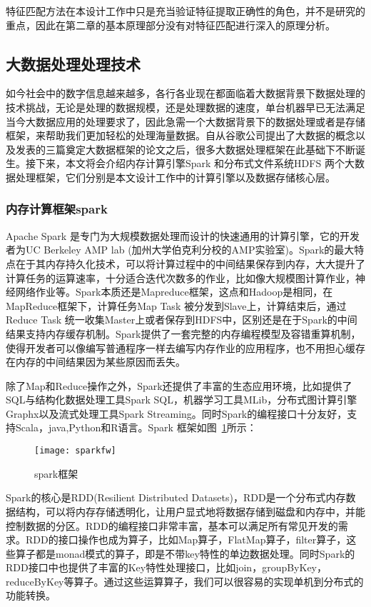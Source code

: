 特征匹配方法在本设计工作中只是充当验证特征提取正确性的角色，并不是研究的重点，因此在第二章的基本原理部分没有对特征匹配进行深入的原理分析。

\subsection{大数据处理处理技术}
如今社会中的数字信息越来越多，各行各业现在都面临着大数据背景下数据处理的技术挑战，无论是处理的数据规模，还是处理数据的速度，单台机器早已无法满足当今大数据应用的处理要求了，因此急需一个大数据背景下的数据处理或者是存储框架，来帮助我们更加轻松的处理海量数据。自从谷歌公司提出了大数据的概念以及发表的三篇奠定大数据框架的论文之后，很多大数据处理框架在此基础下不断诞生。接下来，本文将会介绍内存计算引擎Spark 和分布式文件系统HDFS 两个大数据处理框架，它们分别是本文设计工作中的计算引擎以及数据存储核心层。
\subsubsection{内存计算框架spark}
Apache Spark 是专门为大规模数据处理而设计的快速通用的计算引擎，它的开发者为UC Berkeley AMP lab (加州大学伯克利分校的AMP实验室)。Spark的最大特点在于其内存持久化技术，可以将计算过程中的中间结果保存到内存，大大提升了计算任务的运算速率，十分适合迭代次数多的作业，比如像大规模图计算作业，神经网络作业等。Spark本质还是Mapreduce框架，这点和Hadoop是相同，在MapReduce框架下，计算任务Map Task 被分发到Slave上，计算结束后，通过Reduce Task 统一收集Master上或者保存到HDFS中，区别还是在于Spark的中间结果支持内存缓存机制。Spark提供了一套完整的内存编程模型及容错重算机制，使得开发者可以像编写普通程序一样去编写内存作业的应用程序，也不用担心缓存在内存的中间结果因为某些原因而丢失。

除了Map和Reduce操作之外，Spark还提供了丰富的生态应用环境，比如提供了SQL与结构化数据处理工具Spark SQL，机器学习工具MLib，分布式图计算引擎Graphx以及流式处理工具Spark Streaming。同时Spark的编程接口十分友好，支持Scala，java,Python和R语言。Spark 框架如图~\ref{fig:sparkfw}所示：
\begin{figure}[htp]
\centering
\texttt{[image: sparkfw]}
\caption{spark框架}
\label{fig:sparkfw}
\end{figure}

Spark的核心是RDD(Resilient Distributed Datasets)，RDD是一个分布式内存数据结构，可以将内存存储透明化，让用户显式地将数据存储到磁盘和内存中，并能控制数据的分区。RDD的编程接口非常丰富，基本可以满足所有常见开发的需求。RDD的接口操作也成为算子，比如Map算子，FlatMap算子，filter算子，这些算子都是monad模式的算子，即是不带key特性的单边数据处理。同时Spark的RDD接口中也提供了丰富的Key特性处理接口，比如join，groupByKey，reduceByKey等算子。通过这些运算算子，我们可以很容易的实现单机到分布式的功能转换。

